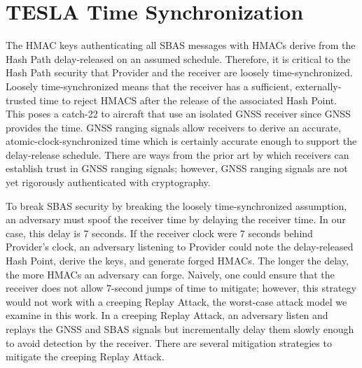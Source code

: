 \documentclass[letterpaper,times]{IONconf/IONconf}
\begin{document}
\section{TESLA Time Synchronization} \label{sec:tesla_time_synchronization}

	The HMAC keys authenticating all SBAS messages with HMACs derive from the Hash Path delay-released on an assumed schedule.
	Therefore, it is critical to the Hash Path security that Provider and the receiver are loosely time-synchronized.
	Loosely time-synchronized means that the receiver has a sufficient, externally-trusted time to reject HMACS after the release of the associated Hash Point.
	This poses a catch-22 to aircraft that use an isolated GNSS receiver since GNSS provides the time.
	GNSS ranging signals allow receivers to derive an accurate, atomic-clock-synchronized time which is certainly accurate enough to support the delay-release schedule.
	There are ways from the prior art by which receivers can establish trust in GNSS ranging signals\cite{Psiaki2016, Fernandez-Hernandez2018}; however, GNSS ranging signals are not yet rigorously authenticated with cryptography.

	To break SBAS security by breaking the loosely time-synchronized assumption, an adversary must spoof the receiver time by delaying the receiver time.
	In our case, this delay is 7 seconds.
	If the receiver clock were 7 seconds behind Provider's clock, an adversary listening to Provider could note the delay-released Hash Point, derive the keys, and generate forged HMACs.
	The longer the delay, the more HMACs an adversary can forge.
	Naively, one could ensure that the receiver does not allow 7-second jumps of time to mitigate; however, this strategy would not work with a creeping Replay Attack, the worst-case attack model we examine in this work.
	In a creeping Replay Attack, an adversary listen and replays the GNSS and SBAS signals but incrementally delay them slowly enough to avoid detection by the receiver.
	There are several mitigation strategies to mitigate the creeping Replay Attack.
\end{document}
